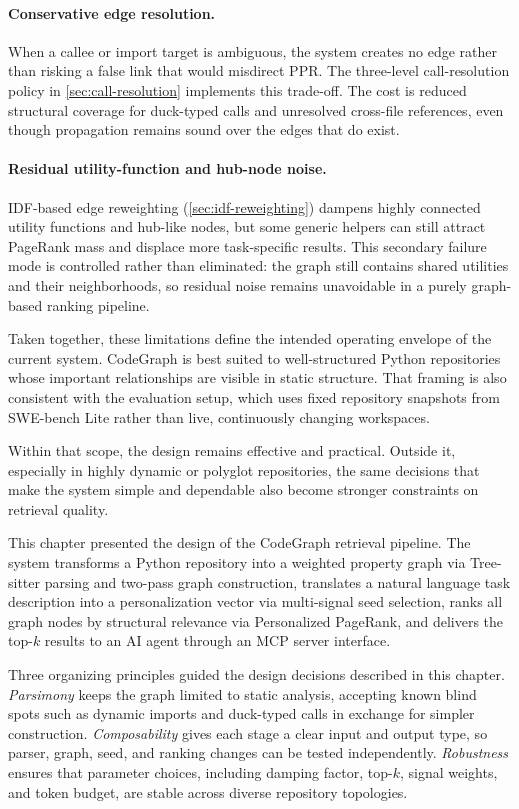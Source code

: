\paragraph{Conservative edge resolution.}
When a callee or import target is ambiguous, the system creates no edge rather than risking a false link that would misdirect PPR. The three-level call-resolution policy in \cref{sec:call-resolution} implements this trade-off. The cost is reduced structural coverage for duck-typed calls and unresolved cross-file references, even though propagation remains sound over the edges that do exist.

\paragraph{Residual utility-function and hub-node noise.}
IDF-based edge reweighting (\cref{sec:idf-reweighting}) dampens highly connected utility functions and hub-like nodes, but some generic helpers can still attract PageRank mass and displace more task-specific results. This secondary failure mode is controlled rather than eliminated: the graph still contains shared utilities and their neighborhoods, so residual noise remains unavoidable in a purely graph-based ranking pipeline.

Taken together, these limitations define the intended operating envelope of the current system. CodeGraph is best suited to well-structured Python repositories whose important relationships are visible in static structure. That framing is also consistent with the evaluation setup, which uses fixed repository snapshots from SWE-bench Lite rather than live, continuously changing workspaces.

Within that scope, the design remains effective and practical. Outside it, especially in highly dynamic or polyglot repositories, the same decisions that make the system simple and dependable also become stronger constraints on retrieval quality.

This chapter presented the design of the CodeGraph retrieval pipeline. The system transforms a Python repository into a weighted property graph via Tree-sitter parsing and two-pass graph construction, translates a natural language task description into a personalization vector via multi-signal seed selection, ranks all graph nodes by structural relevance via Personalized PageRank, and delivers the top-$k$ results to an AI agent through an MCP server interface.

Three organizing principles guided the design decisions described in this chapter. \emph{Parsimony} keeps the graph limited to static analysis, accepting known blind spots such as dynamic imports and duck-typed calls in exchange for simpler construction. \emph{Composability} gives each stage a clear input and output type, so parser, graph, seed, and ranking changes can be tested independently. \emph{Robustness} ensures that parameter choices, including damping factor, top-$k$, signal weights, and token budget, are stable across diverse repository topologies.

